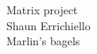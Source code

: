 \documentclass[preview]{standalone}
\begin{document}
Matrix project\\Shaun Errichiello\\Marlin's bagels\\
\end{document}
